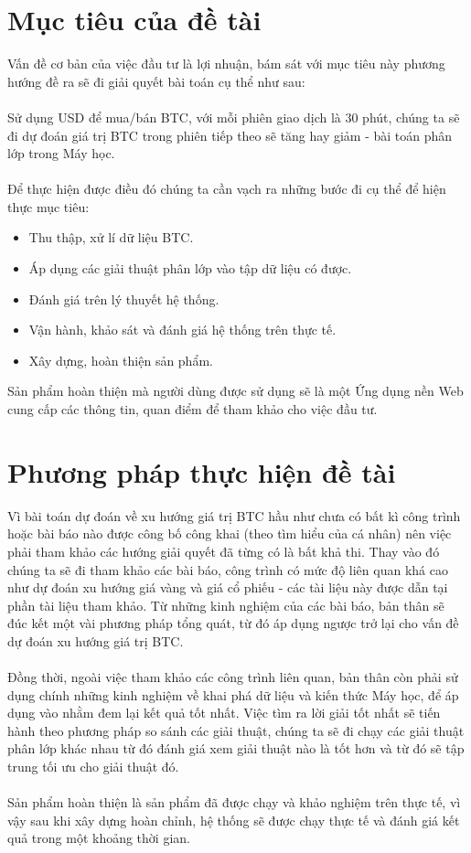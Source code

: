 \section{Mục tiêu của đề tài}
Vấn đề cơ bản của việc đầu tư là lợi nhuận, bám sát với mục tiêu này phương hướng 
đề ra sẽ đi giải quyết bài toán cụ thể như sau:\\\\
Sử dụng USD để mua/bán BTC, với mỗi phiên giao dịch là 30 phút, chúng 
ta sẽ đi dự đoán giá trị BTC trong phiên tiếp theo sẽ tăng hay giảm - bài
toán phân lớp trong Máy học.\\\\
Để thực hiện được điều đó chúng ta cần vạch ra những bước đi cụ
thể để hiện thực mục tiêu:
\begin{itemize}
  \item Thu thập, xử lí dữ liệu BTC.
  \item Áp dụng các giải thuật phân lớp vào tập dữ liệu có được.
  \item Đánh giá trên lý thuyết hệ thống.
  \item Vận hành, khảo sát và đánh giá hệ thống trên thực tế.
  \item Xây dựng, hoàn thiện sản phẩm.
\end{itemize} 
Sản phẩm hoàn thiện mà người dùng được sử dụng sẽ là một Ứng dụng nền Web cung 
cấp các thông tin, quan điểm để tham khảo cho việc đầu tư.
\section{Phương pháp thực hiện đề tài}
Vì bài toán dự đoán về xu hướng giá trị BTC hầu như chưa có bất kì 
công trình hoặc bài báo nào được công bố công khai (theo tìm hiểu của cá nhân) 
nên việc phải tham khảo các hướng giải quyết đã từng có là bất khả thi. Thay vào 
đó chúng ta sẽ đi tham khảo các bài báo, công trình có mức độ liên quan khá cao 
như dự đoán xu hướng giá vàng và giá cổ phiếu - các tài liệu này được dẫn tại 
phần tài liệu tham khảo.
Từ những kinh nghiệm của các bài báo, bản thân sẽ đúc kết một vài phương pháp 
tổng quát, từ đó áp dụng ngược trở lại cho vấn đề dự đoán xu hướng giá trị 
BTC.\\\\
Đồng thời, ngoài việc tham khảo các công trình liên quan, bản thân còn phải 
sử dụng chính những kinh nghiệm về khai phá dữ liệu và kiến thức Máy học, 
để áp dụng vào nhằm đem lại kết quả tốt nhất. Việc tìm ra lời giải tốt nhất sẽ 
tiến hành theo phương pháp so sánh các giải thuật, chúng ta sẽ đi chạy các giải 
thuật phân lớp khác nhau từ đó đánh giá xem giải thuật nào là tốt hơn và từ đó 
sẽ tập trung tối ưu cho giải thuật đó.\\\\
Sản phẩm hoàn thiện là sản phẩm đã được chạy và khảo nghiệm trên thực tế, vì vậy 
sau khi xây dựng hoàn chỉnh, hệ thống sẽ được chạy thực tế và đánh giá kết quả 
trong một khoảng thời gian.
